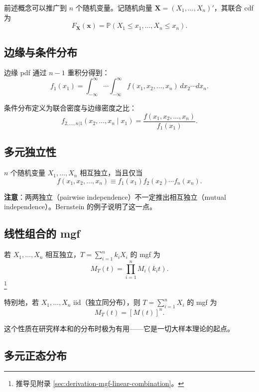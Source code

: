 前述概念可以推广到 $n$ 个随机变量。记随机向量 $\mathbf{X} = (X_1, \ldots, X_n)'$，其联合 cdf 为
\[
F_{\mathbf{X}}(\mathbf{x}) = \mathbb{P}(X_1 \leq x_1, \ldots, X_n \leq x_n).
\]

\subsection{边缘与条件分布}

边缘 pdf 通过 $n-1$ 重积分得到：
\[
f_1(x_1) = \int_{-\infty}^{\infty} \cdots \int_{-\infty}^{\infty} f(x_1, x_2, \ldots, x_n) \, dx_2 \cdots dx_n.
\]

条件分布定义为联合密度与边缘密度之比：
\[
f_{2,\ldots,n|1}(x_2,\ldots,x_n \mid x_1) = \frac{f(x_1, x_2, \ldots, x_n)}{f_1(x_1)}.
\]

\subsection{多元独立性}

$n$ 个随机变量 $X_1, \ldots, X_n$ 相互独立，当且仅当
\begin{equation}\label{eq:multivariate-independence}
f(x_1, x_2, \ldots, x_n) \equiv f_1(x_1) f_2(x_2) \cdots f_n(x_n).

\end{equation}

\textbf{注意}：两两独立（pairwise independence）不一定推出相互独立（mutual independence）。Bernstein 的例子说明了这一点。

\subsection{线性组合的 mgf}

若 $X_1, \ldots, X_n$ 相互独立，$T = \sum_{i=1}^n k_i X_i$ 的 mgf 为
\[
M_T(t) = \prod_{i=1}^n M_i(k_i t).
\]\footnote{推导见附录 \cref{sec:derivation-mgf-linear-combination}。}

特别地，若 $X_1, \ldots, X_n$ iid（独立同分布），则 $T = \sum_{i=1}^n X_i$ 的 mgf 为
\begin{equation}\label{eq:mgf-sum-iid}
M_T(t) = [M(t)]^n.

\end{equation}

这个性质在研究样本和的分布时极为有用——它是一切大样本理论的起点。

\subsection{多元正态分布}


